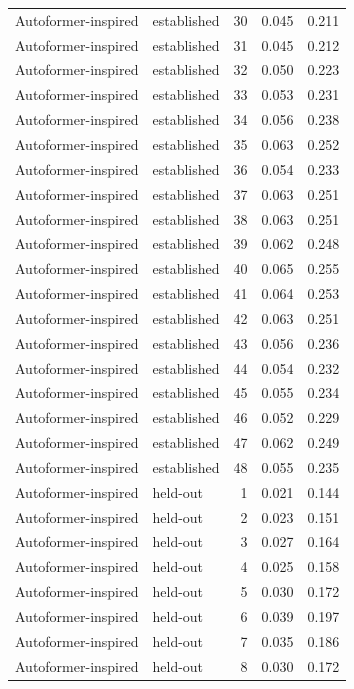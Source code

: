 \begin{tabular}{llrrr}
Autoformer-inspired & established & 30 & 0.045 & 0.211 \\
Autoformer-inspired & established & 31 & 0.045 & 0.212 \\
Autoformer-inspired & established & 32 & 0.050 & 0.223 \\
Autoformer-inspired & established & 33 & 0.053 & 0.231 \\
Autoformer-inspired & established & 34 & 0.056 & 0.238 \\
Autoformer-inspired & established & 35 & 0.063 & 0.252 \\
Autoformer-inspired & established & 36 & 0.054 & 0.233 \\
Autoformer-inspired & established & 37 & 0.063 & 0.251 \\
Autoformer-inspired & established & 38 & 0.063 & 0.251 \\
Autoformer-inspired & established & 39 & 0.062 & 0.248 \\
Autoformer-inspired & established & 40 & 0.065 & 0.255 \\
Autoformer-inspired & established & 41 & 0.064 & 0.253 \\
Autoformer-inspired & established & 42 & 0.063 & 0.251 \\
Autoformer-inspired & established & 43 & 0.056 & 0.236 \\
Autoformer-inspired & established & 44 & 0.054 & 0.232 \\
Autoformer-inspired & established & 45 & 0.055 & 0.234 \\
Autoformer-inspired & established & 46 & 0.052 & 0.229 \\
Autoformer-inspired & established & 47 & 0.062 & 0.249 \\
Autoformer-inspired & established & 48 & 0.055 & 0.235 \\
Autoformer-inspired & held-out & 1 & 0.021 & 0.144 \\
Autoformer-inspired & held-out & 2 & 0.023 & 0.151 \\
Autoformer-inspired & held-out & 3 & 0.027 & 0.164 \\
Autoformer-inspired & held-out & 4 & 0.025 & 0.158 \\
Autoformer-inspired & held-out & 5 & 0.030 & 0.172 \\
Autoformer-inspired & held-out & 6 & 0.039 & 0.197 \\
Autoformer-inspired & held-out & 7 & 0.035 & 0.186 \\
Autoformer-inspired & held-out & 8 & 0.030 & 0.172 \\

\end{tabular}
